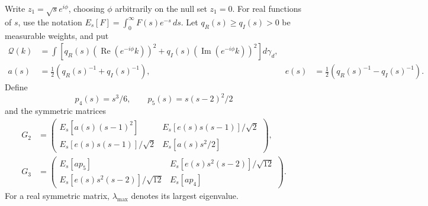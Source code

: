 \documentclass[11pt]{article}
\theoremstyle{remark}\newtheorem{remark}[theorem]{Remark}
\DeclareMathOperator{\Rea}{Re}
\begin{document}
Write \(z_1=\sqrt s e^{i\phi}\), choosing \(\phi\) arbitrarily on
the null set \(z_1=0\). For real functions of \(s\), use the notation
\(E_s[F]=\int_0^\infty F(s)e^{-s}\,ds\). Let
\(q_R(s)\ge q_I(s)>0\) be measurable weights, and put
\begin{align}
 \mathcal Q(k)&=\int\left[q_R(s)(\Rea(e^{-i\phi}k))^2
 +q_I(s)(\operatorname{Im}(e^{-i\phi}k))^2\right]d\gamma_d,
 \label{eq:Q}\\
 a(s)&=\frac12\left(q_R(s)^{-1}+q_I(s)^{-1}\right),&
 e(s)&=\frac12\left(q_R(s)^{-1}-q_I(s)^{-1}\right).
 \label{eq:inverseweights}
\end{align}
Define
\begin{equation}\label{eq:profiles}
p_4(s)=s^3/6,\qquad p_5(s)=s(s-2)^2/2
\end{equation}
and the symmetric matrices
\begin{align}
G_2&=\begin{pmatrix}
E_s[a(s)(s-1)^2]&E_s[e(s)s(s-1)]/\sqrt2\\
E_s[e(s)s(s-1)]/\sqrt2&E_s[a(s)s^2/2]
\end{pmatrix},\label{eq:G2}\\
G_3&=\begin{pmatrix}
E_s[a p_5]&E_s[e(s)s^2(s-2)]/\sqrt{12}\\
E_s[e(s)s^2(s-2)]/\sqrt{12}&E_s[a p_4]
\end{pmatrix}.\label{eq:G3}
\end{align}
For a real symmetric matrix, \(\lambda_{\max}\) denotes its largest
eigenvalue.
\end{document}
